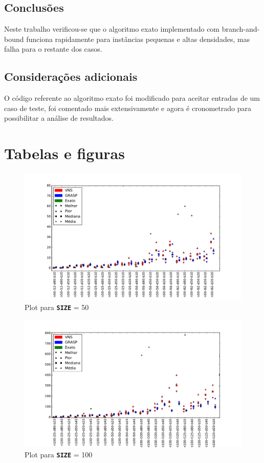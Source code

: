 \documentclass[12pt, a4paper]{article}
\newcommand{\ic}[1]{\textbf{\lstinline{#1}}}
\begin{document}
\subsection{Conclusões}
Neste trabalho verificou-se que o algoritmo exato implementado com
branch-and-bound funciona rapidamente para instâncias pequenas e altas
densidades, mas falha para o restante dos casos.

\subsection{Considerações adicionais}
O código referente ao algoritmo exato foi modificado para aceitar entradas de
um caso de teste, foi comentado mais extensivamente e agora é cronometrado para
possibilitar a análise de resultados.

\section{Tabelas e figuras}

\begin{figure}[H]
    \centering
    \includegraphics[width=1.00\textwidth]{viz1}
    \caption{Plot para \ic{SIZE} = 50}
    \label{fig:graph_1}
\end{figure}

\begin{figure}[H]
    \centering
    \includegraphics[width=1.00\textwidth]{viz2}
    \caption{Plot para \ic{SIZE} = 100}
    \label{fig:graph_2}
\end{figure}
\end{document}
